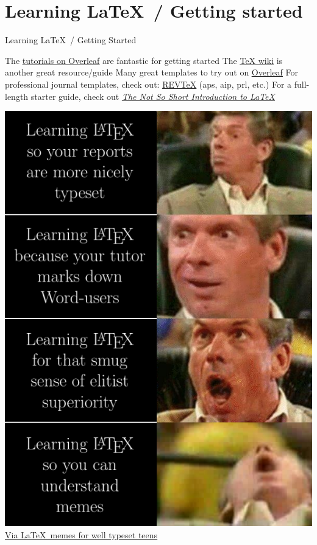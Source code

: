 \documentclass[10pt]{beamer}
\begin{document}
\section{Learning \LaTeX\, / Getting started}
\begin{frame}{Learning \LaTeX\, / Getting Started}

\begin{minipage}{0.5\textwidth}
\bi The \href{https://www.overleaf.com/learn}{\underline{tutorials on Overleaf}} are fantastic for getting started \ei
\bi The \href{https://en.wikibooks.org/wiki/LaTeX/}{\underline{TeX wiki}} is another great resource/guide \ei
\bi Many great templates to try out on \href{https://www.overleaf.com/latex/templates/}{\underline{Overleaf}}
\bi For professional journal templates, check out: \href{https://journals.aps.org/revtex}{\underline{REVTeX}} (aps, aip, prl, etc.) \ei \ei
\bi For a full-length starter guide, check out \textit{\href{https://tobi.oetiker.ch/lshort/lshort-letter.pdf}{The Not So Short Introduction to \LaTeX}}\, \cite{notsoshort} \ei
\end{minipage}
\hfill
\begin{minipage}{.45\textwidth}
\includegraphics[width=\textwidth]{./figures/learnlatex.png} %
{\footnotesize \underline{Via \href{https://www.facebook.com/badness10000/}{\LaTeX\, memes for well typeset teens}}}

\end{minipage}
\end{frame}
\end{document}
